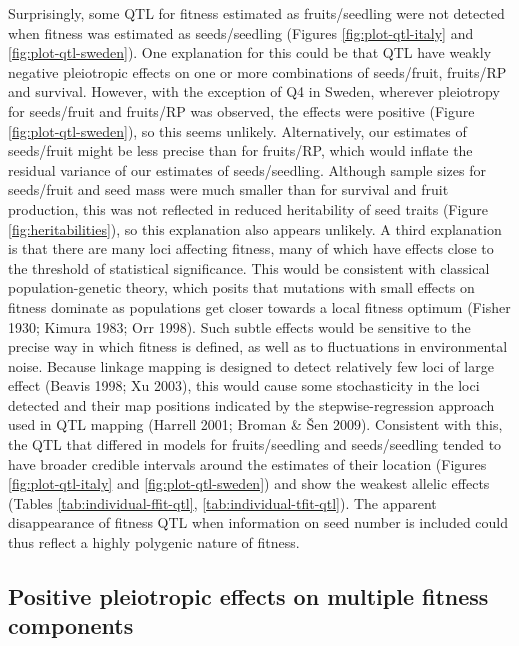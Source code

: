 \documentclass[
]{article}
\begin{document}
Surprisingly, some QTL for fitness estimated as fruits/seedling were not detected when fitness was estimated as seeds/seedling (Figures \ref{fig:plot-qtl-italy} and \ref{fig:plot-qtl-sweden}). One explanation for this could be that QTL have weakly negative pleiotropic effects on one or more combinations of seeds/fruit, fruits/RP and survival. However, with the exception of Q4 in Sweden, wherever pleiotropy for seeds/fruit and fruits/RP was observed, the effects were positive (Figure \ref{fig:plot-qtl-sweden}), so this seems unlikely. Alternatively, our estimates of seeds/fruit might be less precise than for fruits/RP, which would inflate the residual variance of our estimates of seeds/seedling. Although sample sizes for seeds/fruit and seed mass were much smaller than for survival and fruit production, this was not reflected in reduced heritability of seed traits (Figure \ref{fig:heritabilities}), so this explanation also appears unlikely. A third explanation is that there are many loci affecting fitness, many of which have effects close to the threshold of statistical significance. This would be consistent with classical population-genetic theory, which posits that mutations with small effects on fitness dominate as populations get closer towards a local fitness optimum (Fisher 1930; Kimura 1983; Orr 1998). Such subtle effects would be sensitive to the precise way in which fitness is defined, as well as to fluctuations in environmental noise. Because linkage mapping is designed to detect relatively few loci of large effect (Beavis 1998; Xu 2003), this would cause some stochasticity in the loci detected and their map positions indicated by the stepwise-regression approach used in QTL mapping (Harrell 2001; Broman \& Šen 2009). Consistent with this, the QTL that differed in models for fruits/seedling and seeds/seedling tended to have broader credible intervals around the estimates of their location (Figures \ref{fig:plot-qtl-italy} and \ref{fig:plot-qtl-sweden}) and show the weakest allelic effects (Tables \ref{tab:individual-ffit-qtl}, \ref{tab:individual-tfit-qtl}). The apparent disappearance of fitness QTL when information on seed number is included could thus reflect a highly polygenic nature of fitness.

\hypertarget{positive-pleiotropic-effects-on-multiple-fitness-components}{%
\subsection{Positive pleiotropic effects on multiple fitness components}\label{positive-pleiotropic-effects-on-multiple-fitness-components}}
\end{document}
